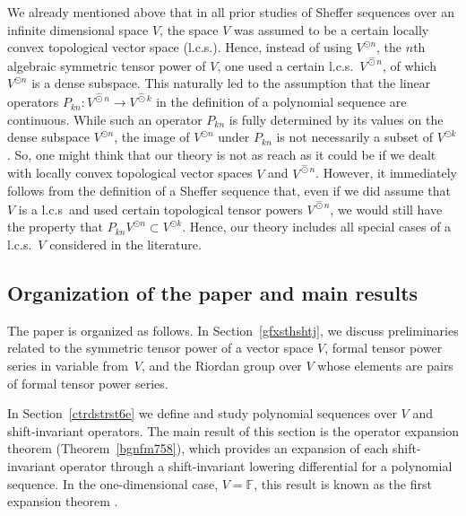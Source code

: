 \documentclass[12pt]{article}
\theoremstyle{remark}
\theoremstyle{remark}
\theoremstyle{remark}
\begin{document}
  We already mentioned above that in all prior studies of Sheffer sequences over an infinite dimensional space $V$, the space $V$ was assumed to be a certain locally convex topological vector space (l.c.s.). Hence, instead of using $V^{\odot n}$, the $n$th algebraic symmetric tensor power of $V$, one used a certain l.c.s.\  $V^{\widehat\odot n}$, of which $V^{\odot n}$ is a  dense subspace.  This naturally led to the assumption that the linear operators $P_{kn}:V^{\widehat \odot n}\to V^{\widehat\odot k}$ in the definition of a polynomial sequence are continuous.   While such an operator $P_{kn}$ is fully determined by its values on the dense subspace $V^{\odot n}$, the image of $V^{\odot n}$ under $P_{kn}$ is not necessarily a subset of $V^{\odot k}$. So, one might think that our theory is not as reach as it could be if we dealt with locally convex topological vector spaces $V$ and $V^{\widehat\odot n}$.  However, it  immediately follows from the definition of a Sheffer sequence that, even if we did assume that
 $V$ is a l.c.s\ and used certain topological tensor powers $V^{\widehat\odot n}$, we would still have the property that $P_{kn}V^{\odot n}\subset V^{\odot k}$.  Hence, our theory  includes all special cases of a l.c.s.\ $V$ considered in the literature.  
 

\subsection{Organization of the paper and main results} 

The paper is organized as follows. In Section~\ref{gfxsthshtj}, we discuss preliminaries related to the symmetric tensor power of a vector space $V$,  formal tensor power series in variable from~$V$, and the Riordan group over $V$ whose elements are pairs of formal tensor power series. 

In Section~\ref{ctrdstrst6e} we define and study polynomial sequences over $V$ and shift-invariant operators. The main result of this section is the operator expansion theorem (Theorem~\ref{bgnfm758}), which provides an expansion of each shift-invariant operator through a shift-invariant lowering differential for a polynomial sequence. In the one-dimensional case, $V=\mathbb F$,  this result is known as the first expansion theorem  \cite[Section~3]{RotaKahanerOdlyzko}. 
\end{document}
